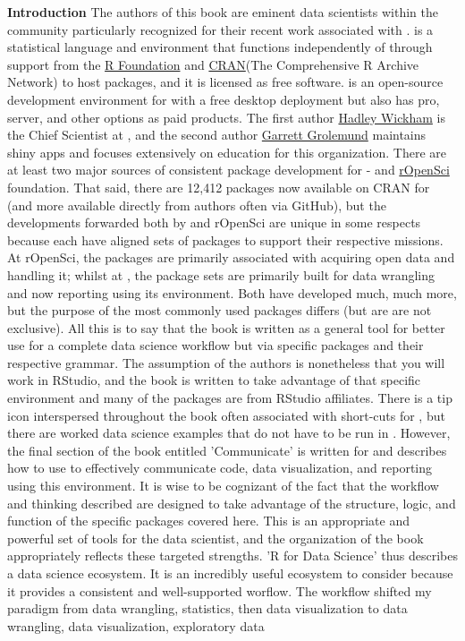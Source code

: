 \documentclass[bookreview]{jss}
\begin{document}
\textbf{Introduction} \newline
The authors of this book are eminent data scientists within the  community particularly recognized for their recent work associated with .  is a statistical language and environment that functions independently of  through support from the \href{https://www.r-project.org/about.html}{R Foundation} and \href{https://cran.r-project.org/mirrors.html}{CRAN}(The Comprehensive R Archive Network) to host packages, and it is licensed as free software.  is an open-source development environment for  with a free desktop deployment but also has pro, server, and other options as paid products. The first author \href{https://en.wikipedia.org/wiki/Hadley_Wickham}{Hadley Wickham} is the Chief Scientist at , and the second author \href{http://www.oreilly.com/pub/au/5570}{Garrett Grolemund} maintains shiny apps and focuses extensively on education for this organization.  There are at least two major sources of consistent package development for  -  and \href{https://ropensci.org/packages/}{rOpenSci} foundation. That said, there are 12,412 packages now available on CRAN for  (and more available directly from authors often via GitHub), but the developments forwarded both by  and rOpenSci are unique in some respects because each have aligned sets of packages to support their respective missions. At rOpenSci, the packages are primarily associated with acquiring open data and handling it; whilst at , the package sets are primarily built for data wrangling and now reporting using its environment. Both have developed much, much more, but the purpose of the most commonly used packages differs (but are are not exclusive). All this is to say that the book is written as a general tool for better  use for a complete data science workflow but via specific packages and their respective grammar. The assumption of the authors is nonetheless that you will work in RStudio, and the book is written to take advantage of that specific environment and many of the packages are from RStudio affiliates. There is a tip icon interspersed throughout the book often associated with short-cuts for , but there are worked data science examples that do not have to be run in . However, the final section of the book entitled 'Communicate' is written for  and describes how to use  to effectively communicate code, data visualization, and reporting using this environment. It is wise to be cognizant of the fact that the workflow and thinking described are designed to take advantage of the structure, logic, and function of the specific packages covered here. This is an appropriate and powerful set of tools for the data scientist, and the organization of the book appropriately reflects these targeted strengths. 'R for Data Science' thus describes a data science ecosystem. It is an incredibly useful ecosystem to consider because it provides a consistent and well-supported worflow. The workflow shifted my paradigm from data wrangling, statistics, then data visualization to data wrangling, data visualization, exploratory data 
\end{document}
